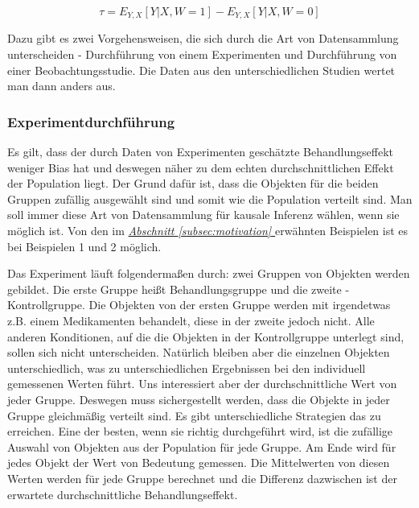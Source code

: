 \documentclass[12pt,a4paper,twoside]{scrartcl}
\numberwithin{equation}{section}
\newcommand{\refsec}[1]{\emph{\hyperref[#1]{Abschnitt \ref*{#1} }}}
\begin{document}
\begin{equation}\label{eq:1.4}
  \tau = E_{Y,X}[Y|X,W = 1] - E_{Y,X}[Y|X,W = 0]
\end{equation}  

\noindent
Dazu gibt es zwei Vorgehensweisen, die sich durch die Art von Datensammlung unterscheiden - Durchführung von einem Experimenten und Durchführung von einer Beobachtungsstudie. Die Daten aus den unterschiedlichen Studien wertet man dann anders aus.\par

\subsubsection{Experimentdurchführung}\label{subsubsec:experimentdurchführung}

Es gilt, dass der durch Daten von Experimenten geschätzte Behandlungseffekt weniger Bias hat und deswegen näher zu dem echten durchschnittlichen Effekt der Population  liegt. Der Grund dafür ist, dass die Objekten für die beiden Gruppen zufällig ausgewählt sind und somit wie die Population verteilt sind.\cite{rubin1974estimating} Man soll immer diese Art von Datensammlung für kausale Inferenz wählen, wenn sie möglich ist. Von den im \refsec{subsec:motivation} erwähnten Beispielen ist es bei Beispielen 1 und 2 möglich. 

\clearpage
\noindent
Das Experiment läuft folgendermaßen durch: zwei Gruppen von Objekten  werden gebildet. Die erste Gruppe heißt Behandlungsgruppe und die zweite  - Kontrollgruppe. Die Objekten von der ersten Gruppe werden mit irgendetwas z.B. einem Medikamenten behandelt, diese in der zweite jedoch nicht. Alle anderen Konditionen, auf die die Objekten in der Kontrollgruppe unterlegt sind, sollen sich nicht unterscheiden. Natürlich bleiben aber die einzelnen Objekten unterschiedlich, was zu unterschiedlichen Ergebnissen bei den individuell gemessenen Werten  führt. Uns interessiert aber der durchschnittliche Wert von jeder Gruppe. Deswegen muss sichergestellt werden, dass die Objekte in jeder Gruppe gleichmäßig verteilt sind. Es gibt unterschiedliche Strategien das zu erreichen. Eine der besten, wenn sie richtig durchgeführt wird, ist die zufällige Auswahl von Objekten aus der Population für jede Gruppe. Am Ende wird für jedes Objekt der Wert von Bedeutung gemessen. Die Mittelwerten von diesen Werten werden für jede Gruppe berechnet und die Differenz dazwischen ist der erwartete durchschnittliche Behandlungseffekt.  
\par
\end{document}
